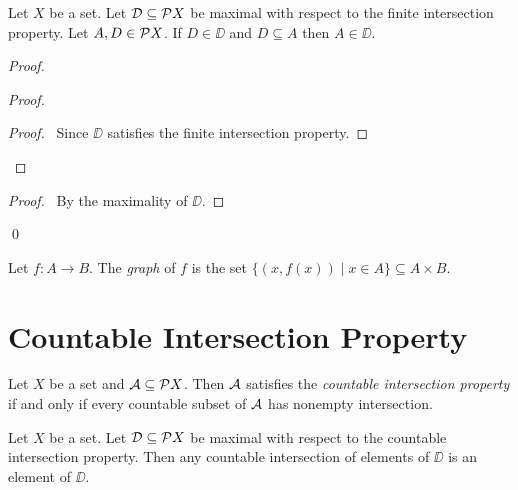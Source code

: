 \begin{proposition}
    Let $X$ be a set. Let $\DD \subseteq \pow X$ be maximal with respect to the
    finite intersection property. Let $A, D \in \pow X$.
    If $D \in \DD$ and $D \subseteq A$ then $A \in \DD$.
\end{proposition}

\begin{proof}
    \pf
    \begin{proof}
        \begin{proof}
            \pf\ Since $\DD$ satisfies the finite intersection property.
        \end{proof}
    \end{proof}
    \begin{proof}
        \pf\ By the maximality of $\DD$.
    \end{proof}
    \qed
\end{proof}

\begin{definition}[Graph]
    Let $f : A \rightarrow B$. The \emph{graph} of $f$ is the set $\{ (x, f(x)) \mid x \in A \} \subseteq A \times B$.
\end{definition}

\section{Countable Intersection Property}

\begin{definition}
    Let $X$ be a set and $\AA \subseteq \pow X$. Then $\AA$ satisfies the \emph{countable intersection property}
    if and only if every countable subset of $\AA$ has nonempty intersection.
\end{definition}

\begin{lemma}
    \label{lemma:countable_intersection_maximal}
    Let $X$ be a set. Let $\DD \subseteq \pow X$ be maximal with respect to the countable intersection property.
    Then any countable intersection of elements of $\DD$ is an element of $\DD$.
\end{lemma}

